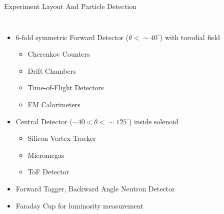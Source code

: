 \documentclass[aspectratio=169]{beamer}
\begin{document}
\begin{frame}{Experiment Layout And Particle Detection} \label{frame:datasets}
\vspace{-0.5cm}
        \begin{columns}[t, onlytextwidth]
                \begin{itemize}
                    \setlength\itemsep{.35em}
                    \item 6-fold symmetric Forward Detector ($\theta < \sim 40 ^{\circ}$) with torodial field
                     \begin{itemize}
                    \setlength\itemsep{.25em}
                        \item Cherenkov Counters
                        \item Drift Chambers
                        \item Time-of-Flight Detectors
                        \item EM Calorimeters
                    \end{itemize}
                      \item Central Detector ($\sim40 < \theta < \sim 125 ^{\circ}$) inside solenoid
                     \begin{itemize}
                    \setlength\itemsep{.25em}
                        \item Silicon Vertex Tracker
                        \item Micromegas
                        \item ToF Detector

                    \end{itemize}
                    
                    \item Forward Tagger, Backward Angle Neutron Detector
                    \item Faraday Cup for luminosity measurement
                
            
                \end{itemize}
            
                \vspace{0.1cm}
                

\end{columns}
\end{frame}
\end{document}
